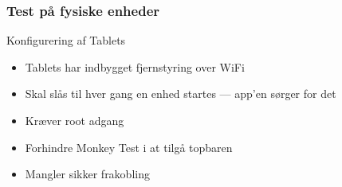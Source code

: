 \begin{frame}
    \frametitle{Test på fysiske enheder}
    Konfigurering af Tablets
    \begin{itemize}
        \item Tablets har indbygget fjernstyring over WiFi
        \item Skal slås til hver gang en enhed startes --- app'en sørger for det
        \item Kræver root adgang
        \item Forhindre Monkey Test i at tilgå topbaren
        \item Mangler sikker frakobling
    \end{itemize}
\end{frame}

